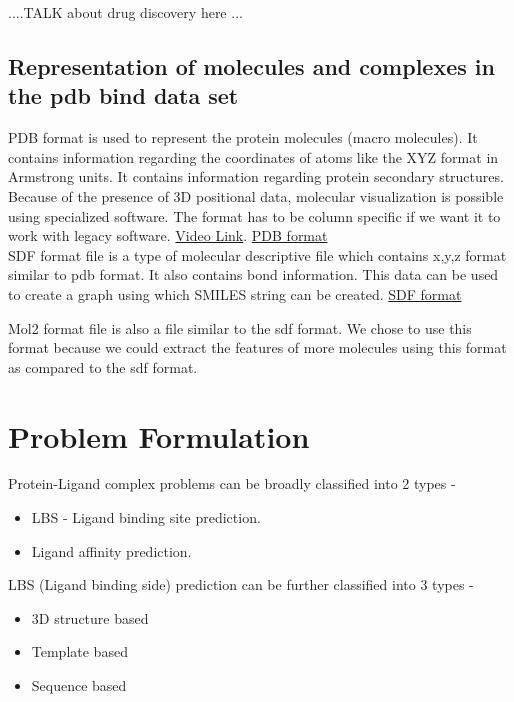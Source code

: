 \documentclass[11pt]{article}
\begin{document}
....TALK about drug discovery here ...

\subsection{Representation of molecules and complexes in the pdb bind data set}

PDB format is used to represent the protein molecules (macro molecules).
It contains information regarding the coordinates of atoms like the XYZ format in Armstrong units.
It contains information regarding protein secondary structures.
Because of the presence of 3D positional data, molecular visualization is possible using specialized software. 
The format has to be column specific if we want it to work with legacy software.
\href{https://www.youtube.com/watch?v=_1q7sfjl2Kw}{Video Link}.
\href{https://en.wikipedia.org/wiki/Protein_Data_Bank_(file_format)}{PDB format}\\

SDF format file is a type of molecular descriptive file which contains x,y,z format similar to pdb format.
It also contains bond information.
This data can be used to create a graph using which SMILES string can be created.
\href{https://en.wikipedia.org/wiki/Chemical_table_file}{SDF format}

Mol2 format file is also a file similar to the sdf format.
We chose to use this format because we could extract the features of more molecules
using this format as compared to the sdf format.

\section{Problem Formulation}
Protein-Ligand complex problems can be broadly classified into 2 types -
\begin{itemize}
\item LBS - Ligand binding site prediction.
\item Ligand affinity prediction.
\end{itemize} 

LBS (Ligand binding side) prediction can be further classified into 3 types -
\begin{itemize}
\item 3D structure based
\item Template based
\item Sequence based
\end{itemize}
\end{document}

